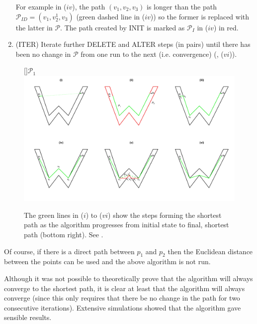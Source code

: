 \begin{enumerate}
For example in  ($iv$), the path $(v_1, v_2, v_3)$ is longer than the path $\mathcal{P}_{ID}=(v_1, v^1_2, v_3)$ (green dashed line in ($iv$)) so the former is replaced with the latter in $\mathcal{P}$. The path created by INIT is marked as $\mathcal{P}_{I}$ in  ($iv$) in red.

\item (ITER) Iterate further DELETE and ALTER steps (in pairs) until there has been no change in $\mathcal{P}$ from one run to the next (i.e. convergence) (, ($vi$)).
\end{enumerate}

\begin{figure}
[]{$\mathcal{P}_1$}
\includegraphics[trim=0in 0.5in 0in 0.25in, width=9.5in]{mds/figs/wdia.pdf} \\
\caption{The green lines in ($i$) to ($vi$) show the steps forming the shortest path as the algorithm progresses from initial state to final, shortest path (bottom right). See .}
\label{wdia}
\end{figure}

Of course, if there is a direct path between $p_1$ and $p_2$ then the Euclidean distance between the points can be used and the above algorithm is not run.

Although it was not possible to theoretically prove that the algorithm will always converge to the shortest path, it is clear at least that the\label{cor-r34} algorithm will always converge (since this only requires that there be no change in the path for two consecutive iterations). Extensive simulations showed that the algorithm gave sensible results.

